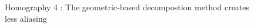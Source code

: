 
\begin{figure}
\caption{Homography 4 : The geometric-based decompostion method creates less aliasing}
\label{Homo4}
\end{figure}

